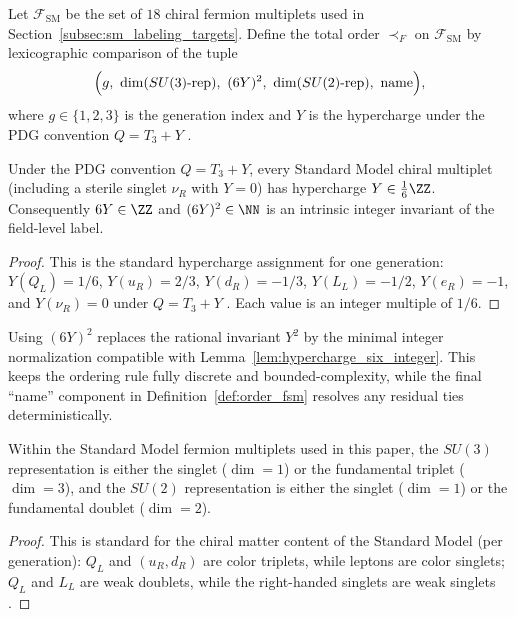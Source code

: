\begin{definition}\label{def:order_fsm}
Let $\mathcal{F}_{\mathrm{SM}}$ be the set of $18$ chiral fermion multiplets used in Section~\ref{subsec:sm_labeling_targets}.
Define the total order $\prec_F$ on $\mathcal{F}_{\mathrm{SM}}$ by lexicographic comparison of the tuple
\[
\Bigl(g,\ \dim(SU(3)\text{-rep}),\ (6Y)^2,\ \dim(SU(2)\text{-rep}),\ \text{name}\Bigr),
\]
where $g\in\{1,2,3\}$ is the generation index and $Y$ is the hypercharge under the PDG convention $Q=T_3+Y$ \cite{PeskinSchroeder1995,PDGRPP2024}.
\end{definition}

\begin{lemma}\label{lem:hypercharge_six_integer}
Under the PDG convention $Q=T_3+Y$, every Standard Model chiral multiplet (including a sterile singlet $\nu_R$ with $Y=0$) has hypercharge $Y\in \frac{1}{6}\ZZ$.
Consequently $6Y\in\ZZ$ and $(6Y)^2\in\NN$ is an intrinsic integer invariant of the field-level label.
\end{lemma}
\begin{proof}
This is the standard hypercharge assignment for one generation: $Y(Q_L)=1/6$, $Y(u_R)=2/3$, $Y(d_R)=-1/3$, $Y(L_L)=-1/2$, $Y(e_R)=-1$, and $Y(\nu_R)=0$ under $Q=T_3+Y$ \cite{PeskinSchroeder1995,PDGRPP2024}.
Each value is an integer multiple of $1/6$.
\end{proof}

\begin{remark}\label{rem:why_6Y_squared}
Using $(6Y)^2$ replaces the rational invariant $Y^2$ by the minimal integer normalization compatible with Lemma~\ref{lem:hypercharge_six_integer}.
This keeps the ordering rule fully discrete and bounded-complexity, while the final ``name'' component in Definition~\ref{def:order_fsm} resolves any residual ties deterministically.
\end{remark}

\begin{lemma}\label{lem:sm_rep_dims}
Within the Standard Model fermion multiplets used in this paper, the $SU(3)$ representation is either the singlet ($\dim=1$) or the fundamental triplet ($\dim=3$), and the $SU(2)$ representation is either the singlet ($\dim=1$) or the fundamental doublet ($\dim=2$).
\end{lemma}
\begin{proof}
This is standard for the chiral matter content of the Standard Model (per generation): $Q_L$ and $(u_R,d_R)$ are color triplets, while leptons are color singlets; $Q_L$ and $L_L$ are weak doublets, while the right-handed singlets are weak singlets \cite{PeskinSchroeder1995,PDGRPP2024}.
\end{proof}

